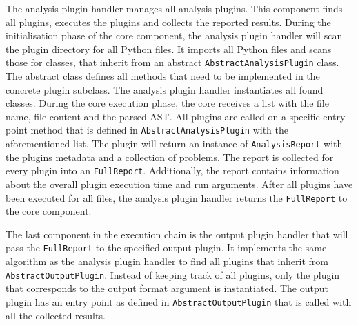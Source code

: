 The analysis plugin handler manages all analysis plugins. This component finds all plugins, executes the plugins and collects the reported results.
During the initialisation phase of the core component, the analysis plugin handler will scan the plugin directory for all Python files. It imports all Python files and scans those for classes, that inherit from an abstract \texttt{AbstractAnalysisPlugin} class. The abstract class defines all methods that need to be implemented in the concrete plugin subclass. The analysis plugin handler instantiates all found classes.
During the core execution phase, the core receives a list with the file name, file content and the parsed AST. All plugins are called on a specific entry point method that is defined in \texttt{AbstractAnalysisPlugin} with the aforementioned list. The plugin will return an instance of \texttt{AnalysisReport} with the plugins metadata and a collection of problems. The report is collected for every plugin into an \texttt{FullReport}. Additionally, the report contains information about the overall plugin execution time and run arguments. After all plugins have been executed for all files, the analysis plugin handler returns the \texttt{FullReport} to the core component.

The last component in the execution chain is the output plugin handler that will pass the \texttt{FullReport} to the specified output plugin. It implements the same algorithm as the analysis plugin handler to find all plugins that inherit from \texttt{AbstractOutputPlugin}. Instead of keeping track of all plugins, only the plugin that corresponds to the output format argument is instantiated. The output plugin has an entry point as defined in \texttt{AbstractOutputPlugin}  that is called with all the collected results.


